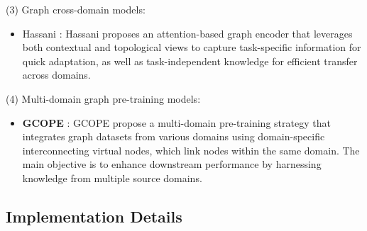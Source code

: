 \noindent (3) Graph cross-domain models:
\begin{itemize}[leftmargin=*]
    \item Hassani \cite{hassani2022cross}: Hassani proposes an attention-based graph encoder that leverages both contextual and topological views to capture task-specific information for quick adaptation, as well as task-independent knowledge for efficient transfer across domains.
\end{itemize}


\noindent (4) Multi-domain graph pre-training models:
\begin{itemize}[leftmargin=*]
    \item \textbf{GCOPE} \cite{zhao2024all}: GCOPE propose a multi-domain pre-training strategy that integrates graph datasets from various domains using domain-specific interconnecting virtual nodes, which link nodes within the same domain. The main objective is to enhance downstream performance by harnessing knowledge from multiple source domains.
\end{itemize}



\subsection{Implementation Details} \label{app.parameters}


